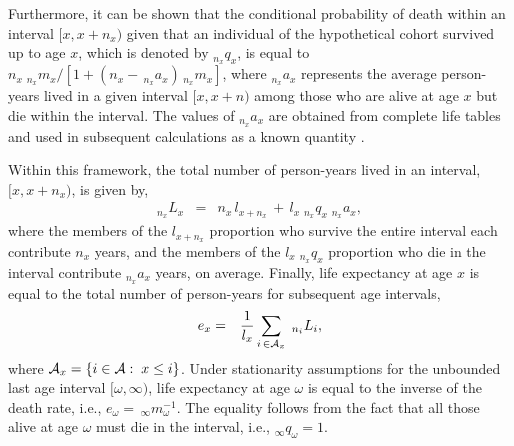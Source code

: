 \documentclass[11pt,letterpaper]{article}
\theoremstyle{plain}
\begin{document}
Furthermore, it can be shown that the conditional probability of death
within an interval $[x,x+n_x)$ given that an individual of the
hypothetical cohort survived up to age $x$, which is denoted by
$_{n_x}q_x$, is equal to
$n_x\;_{n_x}m_x/[1+(n_x-\,_{n_x}a_x)\,_{n_x}m_x]$, where $_{n_x}a_x$
represents the average person-years lived in a given interval $[x,
x+n)$ among those who are alive at age $x$ but die within the
interval.  The values of $_{n_x}a_x$ are obtained from complete life
tables and used in subsequent calculations as a known quantity
\cite{PreHeuGui00}.

Within this framework, the total number of person-years lived in an
interval, $[x, x+n_x)$, is given by,
\begin{eqnarray}
  _{n_x}L_x & = & n_x\,l_{x+n_x}\,+\,l_x\;_{n_x}q_x\;_{n_x}a_x,\label{eq:Lx}
\end{eqnarray}
where the members of the $l_{x+n_x}$ proportion who survive the entire
interval each contribute $n_x$ years, and the members of the
$l_x\;_{n_x}q_x$ proportion who die in the interval contribute
$_{n_x}a_x$ years, on average.  Finally, life expectancy at age $x$ is
equal to the total number of person-years for subsequent age
intervals,
\begin{eqnarray}
  e_x & = & \frac{1}{l_x} \sum_{i\, \in \mathcal{A}_x}\; _{n_i}L_{i}, \label{eq:ex}
\end{eqnarray}
where $\mathcal{A}_x = \{i \in \mathcal{A}: \; x \le i\}$.  Under stationarity
assumptions for the unbounded last age interval $[\omega,\infty)$,
life expectancy at age $\omega$ is equal to the inverse of the death
rate, i.e., $e_\omega=\,_\infty m_\omega^{-1}$.  The equality follows
from the fact that all those alive at age $\omega$ must die in the
interval, i.e., $_\infty q_\omega=1$.
\end{document}
